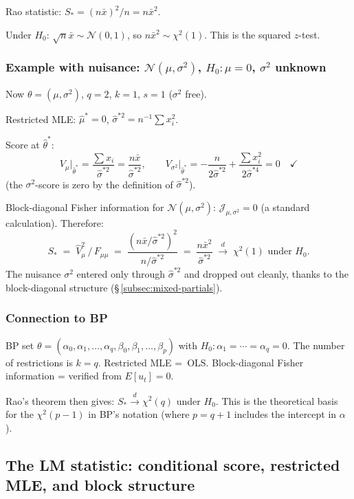 \documentclass[a4paper,oneside,12pt]{extarticle}
\theoremstyle{plain}
\theoremstyle{definition}
\theoremstyle{remark}
\begin{document}
Rao statistic: $S_* = (n\bar x)^2/n = n\bar{x}^2$.

Under $H_0$: $\sqrt{n}\bar{x}\sim\mathcal{N}(0,1)$, so
$n\bar{x}^2\sim\chi^2(1)$. \checkmark  This is the squared $z$-test.

\subsubsection*{Example with nuisance: $\mathcal{N}(\mu,\sigma^2)$,
$H_0:\mu=0$, $\sigma^2$ unknown}

Now $\theta = (\mu,\sigma^2)$, $q=2$, $k=1$, $s=1$ ($\sigma^2$ free).

Restricted MLE: $\hat\mu^* = 0$,
$\hat\sigma^{*2} = n^{-1}\sum x_i^2$.

Score at $\hat\theta^*$:
\[
  V_\mu\big|_{\hat\theta^*}
  = \frac{\sum x_i}{\hat\sigma^{*2}} = \frac{n\bar x}{\hat\sigma^{*2}},
  \qquad
  V_{\sigma^2}\big|_{\hat\theta^*}
  = -\frac{n}{2\hat\sigma^{*2}} + \frac{\sum x_i^2}{2\hat\sigma^{*4}}
  = 0 \quad\checkmark
\]
(the $\sigma^2$-score is zero by the definition of $\hat\sigma^{*2}$).

Block-diagonal Fisher information for $\mathcal{N}(\mu,\sigma^2)$:
$\mathcal{J}_{\mu,\sigma^2} = 0$ (a standard calculation).  Therefore:
\[
  S_* \;=\; \hat{V}_\mu^2\,/\,F_{\mu\mu}
  \;=\; \frac{(n\bar x/\hat\sigma^{*2})^2}{n/\hat\sigma^{*2}}
  \;=\; \frac{n\bar x^2}{\hat\sigma^{*2}}
  \;\xrightarrow{d}\; \chi^2(1) \text{ under } H_0.
\]
The nuisance $\sigma^2$ entered only through $\hat\sigma^{*2}$
and dropped out cleanly, thanks to the block-diagonal structure
(§\,\ref{subsec:mixed-partials}).

\subsubsection*{Connection to BP}

BP set $\theta = (\alpha_0, \alpha_1,\ldots,\alpha_q, \beta_0,\beta_1,
\ldots,\beta_p)$ with $H_0: \alpha_1 = \cdots = \alpha_q = 0$.
The number of restrictions is $k = q$.  Restricted MLE =~OLS.
Block-diagonal Fisher information = verified from $E[u_t] = 0$.

Rao's theorem then gives: $S_* \xrightarrow{d} \chi^2(q)$ under $H_0$.
This is the theoretical basis for the $\chi^2(p-1)$ in BP's notation
(where $p = q+1$ includes the intercept in $\alpha$).


\subsection{The LM statistic: conditional score, restricted MLE, and block structure}
\label{subsec:lm-general}
\end{document}
